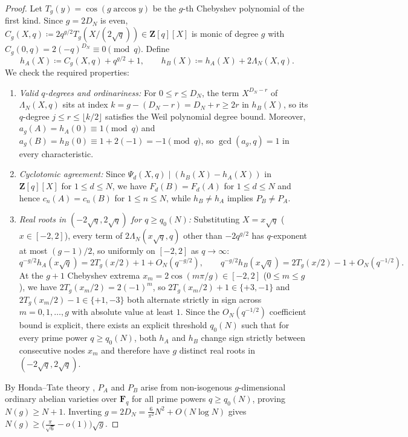 \documentclass[11pt]{amsart}
\theoremstyle{remark}
\newcommand{\F}{\mathbf{F}}
\newcommand{\Z}{\mathbf{Z}}
\begin{document}
\begin{proof}
Let $T_g(y) = \cos(g \arccos y)$ be the $g$-th Chebyshev polynomial of the first kind. Since $g = 2 D_N$ is even, $C_g(X, q) \coloneqq 2 q^{g/2} T_g(X/(2\sqrt{q})) \in \Z[q][X]$ is monic of degree $g$ with $C_g(0, q) = 2(-q)^{D_N} \equiv 0 \pmod{q}$. Define
\[
h_A(X) \coloneqq C_g(X, q) + q^{g/2} + 1, \qquad h_B(X) \coloneqq h_A(X) + 2\Lambda_N(X, q).
\]
We check the required properties:
\begin{enumerate}
\item \emph{Valid $q$-degrees and ordinariness:} For $0 \le r \le D_N$, the term $X^{D_N - r}$ of $\Lambda_N(X, q)$ sits at index $k = g - (D_N - r) = D_N + r \ge 2r$ in $h_B(X)$, so its $q$-degree $j \le r \le \lfloor k/2 \rfloor$ satisfies the Weil polynomial degree bound. Moreover, $a_g(A) = h_A(0) \equiv 1 \pmod{q}$ and $a_g(B) = h_B(0) \equiv 1 + 2(-1) = -1 \pmod{q}$, so $\gcd(a_g, q) = 1$ in every characteristic.
\item \emph{Cyclotomic agreement:} Since $\Psi_d(X, q) \mid (h_B(X) - h_A(X))$ in $\Z[q][X]$ for $1 \le d \le N$, we have $F_d(B) = F_d(A)$ for $1 \le d \le N$ and hence $c_n(A) = c_n(B)$ for $1 \le n \le N$, while $h_B \ne h_A$ implies $P_B \ne P_A$.
\item \emph{Real roots in $(-2\sqrt{q}, 2\sqrt{q})$ for $q \ge q_0(N)$:} Substituting $X = x\sqrt{q}$ ($x \in [-2, 2]$), every term of $2\Lambda_N(x\sqrt{q}, q)$ other than $-2 q^{g/2}$ has $q$-exponent at most $(g - 1)/2$, so uniformly on $[-2, 2]$ as $q \to \infty$:
\[
q^{-g/2} h_A(x\sqrt{q}) = 2 T_g(x/2) + 1 + O_N(q^{-g/2}), \qquad q^{-g/2} h_B(x\sqrt{q}) = 2 T_g(x/2) - 1 + O_N(q^{-1/2}).
\]
At the $g + 1$ Chebyshev extrema $x_m = 2\cos(m\pi/g) \in [-2, 2]$ ($0 \le m \le g$), we have $2 T_g(x_m/2) = 2(-1)^m$, so $2 T_g(x_m/2) + 1 \in \{+3, -1\}$ and $2 T_g(x_m/2) - 1 \in \{+1, -3\}$ both alternate strictly in sign across $m = 0, 1, \dots, g$ with absolute value at least $1$. Since the $O_N(q^{-1/2})$ coefficient bound is explicit, there exists an explicit threshold $q_0(N)$ such that for every prime power $q \ge q_0(N)$, both $h_A$ and $h_B$ change sign strictly between consecutive nodes $x_m$ and therefore have $g$ distinct real roots in $(-2\sqrt{q}, 2\sqrt{q})$.
\end{enumerate}
By Honda--Tate theory \cite{Tat71,How95}, $P_A$ and $P_B$ arise from non-isogenous $g$-dimensional ordinary abelian varieties over $\F_q$ for all prime powers $q \ge q_0(N)$, proving $N(g) \ge N + 1$. Inverting $g = 2 D_N = \frac{6}{\pi^2} N^2 + O(N\log N)$ gives $N(g) \ge \bigl(\frac{\pi}{\sqrt{6}} - o(1)\bigr)\sqrt{g}$.
\end{proof}
\end{document}
